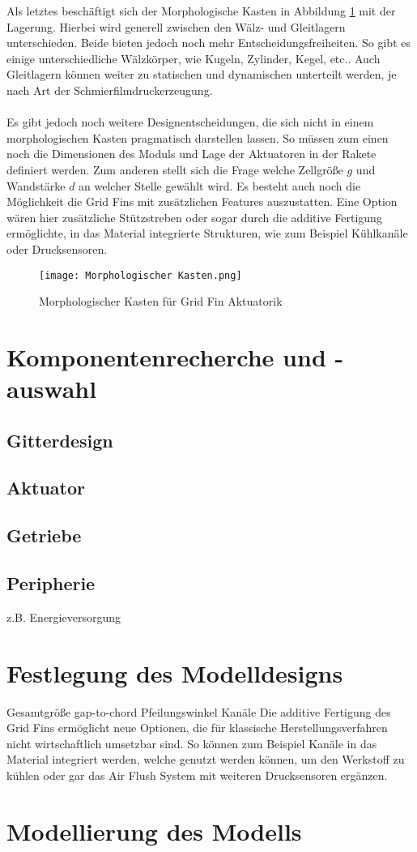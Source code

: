 Als letztes beschäftigt sich der Morphologische Kasten in Abbildung \ref{abb_MorphKast} mit der Lagerung. Hierbei wird generell zwischen den Wälz- und Gleitlagern unterschieden. Beide bieten jedoch noch mehr Entscheidungsfreiheiten. So gibt es einige unterschiedliche Wälzkörper, wie Kugeln, Zylinder, Kegel, etc.. Auch Gleitlagern können weiter zu statischen und dynamischen unterteilt werden, je nach Art der Schmierfilmdruckerzeugung.
\\~\\
Es gibt jedoch noch weitere Designentscheidungen, die sich nicht in einem morphologischen Kasten pragmatisch darstellen lassen. So müssen zum einen noch die Dimensionen des Moduls und Lage der Aktuatoren in der Rakete definiert werden. Zum anderen stellt sich die Frage welche Zellgröße $g$ und Wandstärke $d$ an welcher Stelle gewählt wird. Es besteht auch noch die Möglichkeit die Grid Fins mit zusätzlichen Features auszustatten. Eine Option wären hier zusätzliche Stützstreben oder sogar durch die additive Fertigung ermöglichte, in das Material integrierte Strukturen, wie zum Beispiel Kühlkanäle oder Drucksensoren.
\begin{figure}[h]
	\centering
	\texttt{[image: Morphologischer Kasten.png]}
	\caption{Morphologischer Kasten für Grid Fin Aktuatorik}
	\label{abb_MorphKast}
\end{figure}
\newpage
\section{Komponentenrecherche und -auswahl}
\subsection{Gitterdesign}
\subsection{Aktuator}
\subsection{Getriebe}
\subsection{Peripherie}
z.B. Energieversorgung

\section{Festlegung des Modelldesigns}\label{sec:modelldesign}
Gesamtgröße
gap-to-chord
Pfeilungswinkel
Kanäle
Die additive Fertigung des Grid Fins ermöglicht neue Optionen, die für klassische Herstellungsverfahren nicht wirtschaftlich umsetzbar sind. So können zum Beispiel Kanäle in das Material integriert werden, welche genutzt werden können, um den Werkstoff zu kühlen oder gar das Air Flush System mit weiteren Drucksensoren ergänzen.

\section{Modellierung des Modells}